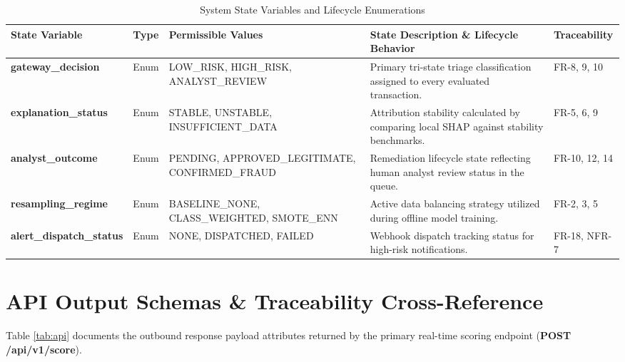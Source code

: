 \documentclass[12pt, a4paper]{report}
\begin{document}
\begin{table}[h]
\centering
\small
\begin{tabularx}{\textwidth}{|R{3.6cm}|l|R{3.4cm}|X|R{2.0cm}|}
\hline
{}
\textbf{{State Variable}} & \textbf{{Type}} & \textbf{{Permissible Values}} & \textbf{{State Description \& Lifecycle Behavior}} & \textbf{{Traceability}} \\
\hline
\textbf{gateway\_\allowbreak{}decision} & Enum & LOW\_\allowbreak{}RISK, HIGH\_\allowbreak{}RISK, ANALYST\_\allowbreak{}REVIEW & Primary tri-state triage classification assigned to every evaluated transaction. & FR-8, 9, 10 \\
\hline
\textbf{explanation\_\allowbreak{}status} & Enum & STABLE, UNSTABLE, INSUFFICIENT\_\allowbreak{}DATA & Attribution stability calculated by comparing local SHAP against stability benchmarks. & FR-5, 6, 9 \\
\hline
\textbf{analyst\_\allowbreak{}outcome} & Enum & PENDING, APPROVED\_\allowbreak{}LEGITIMATE, CONFIRMED\_\allowbreak{}FRAUD & Remediation lifecycle state reflecting human analyst review status in the queue. & FR-10, 12, 14 \\
\hline
\textbf{resampling\_\allowbreak{}regime} & Enum & BASELINE\_\allowbreak{}NONE, CLASS\_\allowbreak{}WEIGHTED, SMOTE\_\allowbreak{}ENN & Active data balancing strategy utilized during offline model training. & FR-2, 3, 5 \\
\hline
\textbf{alert\_\allowbreak{}dispatch\_\allowbreak{}status} & Enum & NONE, DISPATCHED, FAILED & Webhook dispatch tracking status for high-risk notifications. & FR-18, NFR-7 \\
\hline
\end{tabularx}
\caption{System State Variables and Lifecycle Enumerations}
\label{tab:states}
\end{table}

\section{API Output Schemas \& Traceability Cross-Reference}
Table \ref{tab:api} documents the outbound response payload attributes returned by the primary real-time scoring endpoint (\textbf{POST /api/v1/score}).
\end{document}
